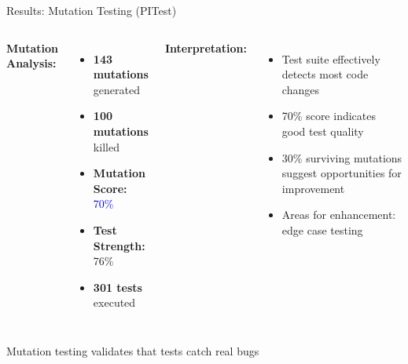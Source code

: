 \documentclass[aspectratio=169]{beamer}
\begin{document}
\begin{frame}{Results: Mutation Testing (PITest)}
\begin{columns}
\textbf{Mutation Analysis:}
\begin{itemize}
    \item \textbf{143 mutations} generated
    \item \textbf{100 mutations} killed
    \item \textbf{Mutation Score:} \textcolor{blue}{70\%}
    \item \textbf{Test Strength:} 76\%
    \item \textbf{301 tests} executed
\end{itemize}

\textbf{Interpretation:}
\begin{itemize}
    \item Test suite effectively detects most code changes
    \item 70\% score indicates good test quality
    \item 30\% surviving mutations suggest opportunities for improvement
    \item Areas for enhancement: edge case testing
\end{itemize}
\end{columns}

\vspace{0.3cm}
\begin{center}
\small Mutation testing validates that tests catch real bugs
\end{center}
\end{frame}
\end{document}
